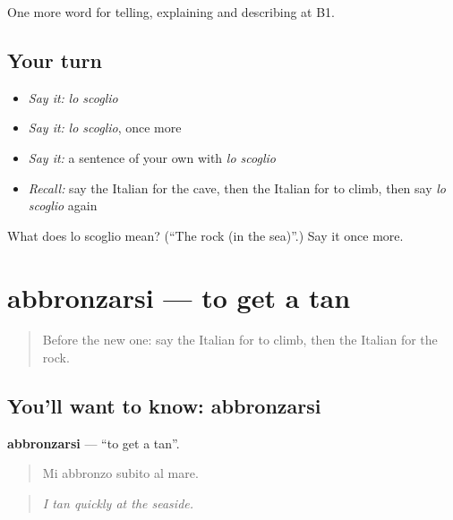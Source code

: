 \begin{grammarlens}[title={What you've built}]
One more word for telling, explaining and describing at B1.
\end{grammarlens}

\subsection*{Your turn}
\begin{itemize}
\raggedright
  \item \emph{Say it:} \emph{lo scoglio}
  \item \emph{Say it:} \emph{lo scoglio}, once more
  \item \emph{Say it:} a sentence of your own with \emph{lo scoglio}
  \item \emph{Recall:} say the Italian for the cave, then the Italian for to climb, then say \emph{lo scoglio} again
\end{itemize}

\begin{tcolorbox}[breakable,colback=teal!4,colframe=teal!35!black,title={Before you move on}]
What does lo scoglio mean? (\textquotedblleft{}The rock (in the sea)\textquotedblright{}.) Say it once more.
\end{tcolorbox}
\section[abbronzarsi]{abbronzarsi — to get a tan}

\label{lesson:IT-C463-abbronzarsi}



\begin{quote}
Before the new one: say the Italian for to climb, then the Italian for the rock.
\end{quote}

\subsection*{You'll want to know: abbronzarsi}
\textbf{abbronzarsi} — \textquotedblleft{}to get a tan\textquotedblright{}.

\begin{quote}
Mi abbronzo subito al mare.
\end{quote}

\begin{quote}
\emph{I tan quickly at the seaside.}
\end{quote}

